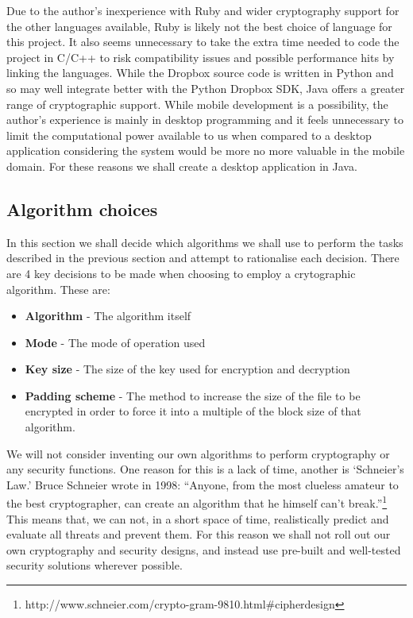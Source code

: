 \documentclass[12pt, titlepage]{article}
\begin{document}
\newline \indent Due to the author's inexperience with Ruby and wider cryptography support for the other languages available, Ruby is likely not the best choice of language for this project. It also seems unnecessary to take the extra time needed to code the project in C/C++ to risk compatibility issues and possible performance hits by linking the languages. While the Dropbox source code is written in Python and so may well integrate better with the Python Dropbox SDK, Java offers a greater range of cryptographic support.
\newline \indent While mobile development is a possibility, the author's experience is mainly in desktop programming and it feels unnecessary to limit the computational power available to us when compared to a desktop application considering the system would be more no more valuable in the mobile domain.
\newline \indent For these reasons we shall create a desktop application in Java.

\subsection{Algorithm choices}
In this section we shall decide which algorithms we shall use to perform the tasks described in the previous section and attempt to rationalise each decision.
\newline \indent There are 4 key decisions to be made when choosing to employ a crytographic algorithm. These are:
\begin{itemize}
	\item \textbf{Algorithm} - The algorithm itself
	\item \textbf{Mode} - The mode of operation used
	\item \textbf{Key size} - The size of the key used for encryption and decryption
	\item \textbf{Padding scheme} - The method to increase the size of the file to be encrypted in order to force it into a multiple of the block size of that algorithm.
\end{itemize}
We will not consider inventing our own algorithms to perform cryptography or any security functions. One reason for this is a lack of time, another is `Schneier's Law.' Bruce Schneier wrote in 1998: ``Anyone, from the most clueless amateur to the best cryptographer, can create an algorithm that he himself can't break.''\footnote{http://www.schneier.com/crypto-gram-9810.html\#cipherdesign} This means that, we can not, in a short space of time, realistically predict and evaluate all threats and prevent them. For this reason we shall not roll out our own cryptography and security designs, and instead use pre-built and well-tested security solutions wherever possible.
\end{document}

